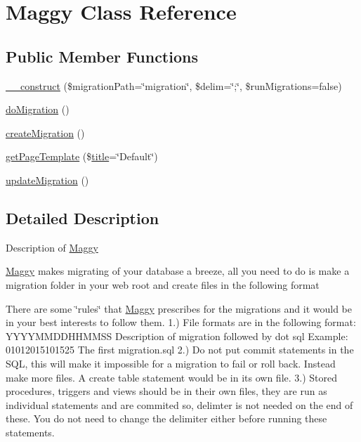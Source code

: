 \hypertarget{classMaggy}{}\section{Maggy Class Reference}
\label{classMaggy}
\subsection*{Public Member Functions}
\begin{DoxyCompactItemize}
\item 
\hyperlink{classMaggy_a067cf2f5b502b1ff73d63e1a2b927545}{\+\_\+\+\_\+construct} (\$migration\+Path=\char`\"{}migration\char`\"{}, \$delim=\char`\"{};\char`\"{}, \$run\+Migrations=false)
\item 
\hyperlink{classMaggy_a4c8fb8426aeb2aaed4968fbb207d19c2}{do\+Migration} ()
\item 
\hyperlink{classMaggy_a2b4d618fa3afc138f4b1cab39adc371c}{create\+Migration} ()
\item 
\hyperlink{classMaggy_a494c35bf7f6d5a704e430d20da195954}{get\+Page\+Template} (\$\hyperlink{Shape_8php_ad264ad0cabbe965bf7f7c8a5ed6abebb}{title}=\char`\"{}Default\char`\"{})
\item 
\hyperlink{classMaggy_afd787d71f29b356d6a6de0d0707b6be4}{update\+Migration} ()
\end{DoxyCompactItemize}


\subsection{Detailed Description}
Description of \hyperlink{classMaggy}{Maggy}

\hyperlink{classMaggy}{Maggy} makes migrating of your database a breeze, all you need to do is make a migration folder in your web root and create files in the following format

There are some \char`\"{}rules\char`\"{} that \hyperlink{classMaggy}{Maggy} prescribes for the migrations and it would be in your best interests to follow them. 1.) File formats are in the following format\+: Y\+Y\+Y\+Y\+M\+M\+D\+D\+H\+H\+M\+M\+S\+S Description of migration followed by dot sql Example\+: 01012015101525 The first migration.\+sql 2.) Do not put commit statements in the S\+Q\+L, this will make it impossible for a migration to fail or roll back. Instead make more files. A create table statement would be in its own file. 3.) Stored procedures, triggers and views should be in their own files, they are run as individual statements and are commited so, delimter is not needed on the end of these. You do not need to change the delimiter either before running these statements.

